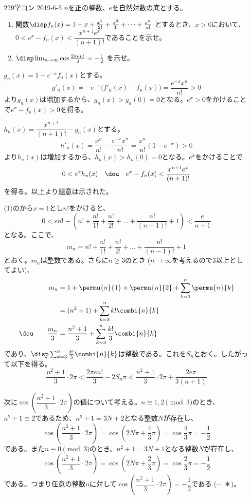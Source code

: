 \begin{thm}{229}{}{学コン 2019-6-5}
 $n$を正の整数、$e$を自然対数の底とする。
 \begin{enumerate}
  \item 関数$\disp f_n(x)=1+x+\frac{x^2}{2!}+\frac{x^3}{3!}+\dots +\frac{x^n}{n!}$ とするとき、$x>0$において、$0<e^x-f_n(x)<\dfrac{x^{n+1}e^x}{(n+1)!}$であることを示せ。
  \item $\disp \lim_{n\to\infty} \cos\frac{2\pi e n!}{3}=-\frac{1}{2}$ を示せ。
 \end{enumerate}
\end{thm}


$g_n(x)=1-e^{-x}f_n(x)$とする。
\[ g'_n(x)=-e^{-x}\bigl(f'_n(x)-f_n(x)\bigr)=\frac{e^{-x}x^n}{n!}>0 \]
より$g_n(x)$は増加するから、$g_n(x)>g_n(0)=0$となる。$e^x>0$をかけることで$e^x-f_n(x)>0$を得る。

$h_n(x)=\dfrac{x^{n+1}}{(n+1)!}-g_n(x)$とする。
\[ h'_n(x)=\frac{x^n}{n!}-\frac{e^{-x}x^n}{n!}=\frac{x^n}{n!}(1-e^{-x})>0 \]
より$h_n(x)$は増加するから、$h_n(x)>h_n(0)=0$となる。$e^x$をかけることで
\[ 0<e^xh_n(x) \quad\dou\quad e^x-f_n(x)<\frac{x^{n+1}e^x}{(n+1)!} \]
を得る。以上より題意は示された。


(1)のから$x=1$とし$n!$をかけると、
\[ 0<en!-\left(n!+\frac{n!}{1!}+\frac{n!}{2!}+\dots +\frac{n!}{(n-1)!}+1\right) < \frac{e}{n+1} \]
となる。ここで、
\[ m_n=n!+\frac{n!}{1!}+\frac{n!}{2!}+\dots +\frac{n!}{(n-1)!}+1 \]
とおく。$m_n$は整数である。さらに$n\ge 3$のとき ($n\to\infty$を考えるので3以上としてよい)、
\begin{align*}
 m_n&= 1+\permu{n}{1}+\permu{n}{2}+\sum_{k=3}^n\permu{n}{k} \\
 &= (n^2+1)+\sum_{k=3}^nk!\combi{n}{k} \\
 \dou\qquad \frac{m_n}{3}&= \frac{n^2+1}{3}+\sum_{k=3}^n\frac{k!}{3}\combi{n}{k}
\end{align*}
であり、$\disp \sum_{k=3}^n\frac{k!}{3}\combi{n}{k}$は整数である。これを$S_n$とおく。したがって以下を得る。
\[ \frac{n^2+1}{3}\cdot 2\pi < \frac{2\pi e n!}{3}-2S_n\pi < \frac{n^2+1}{3}\cdot 2\pi+\frac{2e\pi}{3(n+1)} \]

次に$\cos\left(\dfrac{n^2+1}{3}\cdot 2\pi\right)$の値について考える。$n\equiv 1, 2 \pmod{3}$のとき、$n^2+1\equiv 2$であるため、$n^2+1=3N+2$となる整数$N$が存在し、
\[ \cos\left(\frac{n^2+1}{3}\cdot 2\pi\right)=\cos\left(2N\pi+\frac{4}{3}\pi\right)=\cos\frac{4}{3}\pi=-\frac{1}{2} \]
である。また$n\equiv 0 \pmod{3}$のとき、$n^2+1=3N+1$となる整数$N$が存在し、
\[ \cos\left(\frac{n^2+1}{3}\cdot 2\pi\right)=\cos\left(2N\pi+\frac{2}{3}\pi\right)=\cos\frac{2}{3}\pi=-\frac{1}{2} \]
である。つまり任意の整数$n$に対して$\cos\left(\dfrac{n^2+1}{3}\cdot 2\pi\right)=-\dfrac{1}{2}$である ($\cdots$ ＊)。

